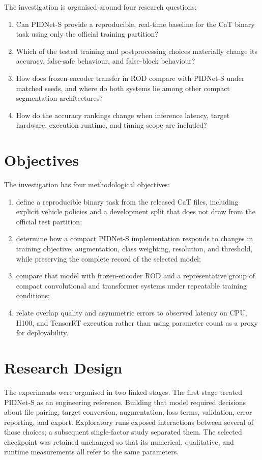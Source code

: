 The investigation is organised around four research questions:
\begin{enumerate}
  \item Can PIDNet-S provide a reproducible, real-time baseline for the CaT
  binary task using only the official training partition?
  \item Which of the tested training and postprocessing choices materially
  change its accuracy, false-safe behaviour, and false-block behaviour?
  \item How does frozen-encoder transfer in ROD compare with PIDNet-S under
  matched seeds, and where do both systems lie among other compact
  segmentation architectures?
  \item How do the accuracy rankings change when inference latency, target
  hardware, execution runtime, and timing scope are included?
\end{enumerate}

\section{Objectives}

The investigation has four methodological objectives:
\begin{enumerate}
  \item define a reproducible binary task from the released CaT files,
  including explicit vehicle policies and a development split that does not
  draw from the official test partition;
  \item determine how a compact PIDNet-S implementation responds to changes in
  training objective, augmentation, class weighting, resolution, and
  threshold, while preserving the complete record of the selected model;
  \item compare that model with frozen-encoder ROD and a representative group
  of compact convolutional and transformer systems under repeatable training
  conditions;
  \item relate overlap quality and asymmetric errors to observed latency on
  CPU, H100, and TensorRT execution rather than using parameter count as a
  proxy for deployability.
\end{enumerate}

\section{Research Design}

The experiments were organised in two linked stages. The first stage treated
PIDNet-S as an engineering reference. Building that model required decisions
about file pairing, target conversion, augmentation, loss terms, validation,
error reporting, and export. Exploratory runs exposed interactions between
several of those choices; a subsequent single-factor study separated them.
The selected checkpoint was retained unchanged so that its numerical,
qualitative, and runtime measurements all refer to the same parameters.

